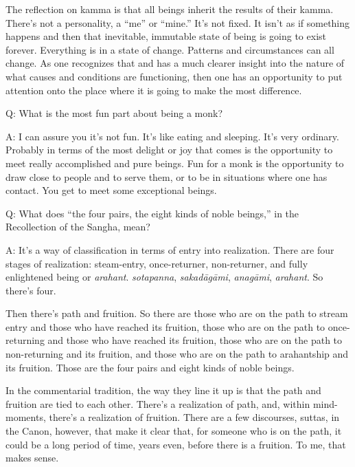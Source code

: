 The reflection on kamma is that all beings inherit the results of their
kamma. There’s not a personality, a “me” or “mine.” It’s not fixed. It
isn’t as if something happens and then that inevitable, immutable state
of being is going to exist forever. Everything is in a state of change.
Patterns and circumstances can all change. As one recognizes that and
has a much clearer insight into the nature of what causes and conditions
are functioning, then one has an opportunity to put attention onto the
place where it is going to make the most difference.

\vspace{\the\qaskip}
Q: What is the most fun part about being a monk?

\vspace{\the\qaskip}
A: I can assure you it’s not fun. It’s like eating and sleeping. It’s
very ordinary. Probably in terms of the most delight or joy that comes
is the opportunity to meet really accomplished and pure beings. Fun for
a monk is the opportunity to draw close to people and to serve them, or
to be in situations where one has contact. You get to meet some
exceptional beings.

\vspace{\the\qaskip}
Q: What does “the four pairs, the eight kinds of noble beings,” in the
Recollection of the Sangha, mean?

\vspace{\the\qaskip}
A: It’s a way of classification in terms of entry into realization.
There are four stages of realization: steam-entry, once-returner,
non-returner, and fully enlightened being or \emph{arahant}.
\emph{sotapanna}, \emph{sakadāgāmi}, \emph{anagāmi}, \emph{arahant}. So
there’s four.

Then there’s path and fruition. So there are those who are on the path
to stream entry and those who have reached its fruition, those who are
on the path to once-returning and those who have reached its fruition,
those who are on the path to non-returning and its fruition, and those
who are on the path to arahantship and its fruition. Those are the four
pairs and eight kinds of noble beings.

In the commentarial tradition, the way they line it up is that the path
and fruition are tied to each other. There’s a realization of path, and,
within mind-moments, there’s a realization of fruition. There are a few
discourses, suttas, in the Canon, however, that make it clear that, for
someone who is on the path, it could be a long period of time, years
even, before there is a fruition. To me, that makes sense.

